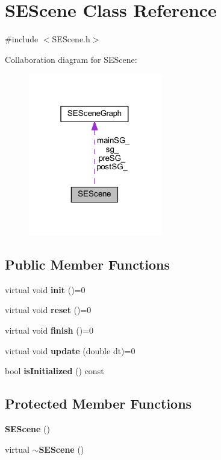 \section{S\+E\+Scene Class Reference}
\label{class_s_e_scene}


{\ttfamily \#include $<$S\+E\+Scene.\+h$>$}



Collaboration diagram for S\+E\+Scene\+:
\nopagebreak
\begin{figure}[H]
\begin{center}
\leavevmode
\includegraphics[width=166pt]{class_s_e_scene__coll__graph}
\end{center}
\end{figure}
\subsection*{Public Member Functions}
\begin{DoxyCompactItemize}
\item 
virtual void {\bf init} ()=0
\item 
virtual void {\bf reset} ()=0
\item 
virtual void {\bf finish} ()=0
\item 
virtual void {\bf update} (double dt)=0
\item 
bool {\bf is\+Initialized} () const 
\end{DoxyCompactItemize}
\subsection*{Protected Member Functions}
\begin{DoxyCompactItemize}
\item 
{\bf S\+E\+Scene} ()
\item 
virtual {\bf $\sim$\+S\+E\+Scene} ()
\end{DoxyCompactItemize}
